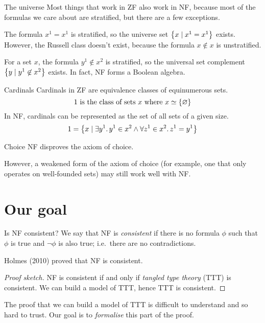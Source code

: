 \documentclass[xcolor=dvipsnames]{beamer}
\begin{document}
\begin{frame}{The universe}
    Most things that work in ZF also work in NF, because most of the formulas we care about are stratified, but there are a few exceptions.

    \medskip

    The formula \( x^1 = x^1 \) is stratified, so the universe set \( \qty{x\mid x^1 = x^1} \) exists. However, the Russell class doesn't exist, because the formula \( x \not\in x \) is unstratified.

    \medskip

    For a set \( x \), the formula \( y^1 \not\in x^2 \) is stratified, so the universal set complement \( \qty{y\mid y^1 \not\in x^2} \) exists. In fact, NF forms a Boolean algebra.
\end{frame}
\begin{frame}{Cardinals}
    Cardinals in ZF are equivalence classes of equinumerous sets.
    \[ 1 \text{ is the class of sets } x \text{ where } x \simeq \qty{\varnothing} \]
    In NF, cardinals can be represented as the set of all sets of a given size.
    \[ 1 = \qty{x\mid \exists y^1.\, y^1 \in x^2 \wedge \forall z^1 \in x^2.\, z^1 = y^1} \]
\end{frame}
\begin{frame}{Choice}
    NF disproves the axiom of choice.

    \medskip

    However, a weakened form of the axiom of choice (for example, one that only operates on well-founded sets) may still work well with NF.
\end{frame}

\section{Our goal}

\begin{frame}{Is NF consistent?}
    We say that NF is \emph{consistent} if there is no formula \( \phi \) such that \( \phi \) is true and \( \neg\phi \) is also true; i.e.\, there are no contradictions.

    Holmes (2010) proved that NF is consistent.

    \begin{proof}[Proof sketch]
        NF is consistent if and only if \emph{tangled type theory} (TTT) is consistent.
        We can build a model of TTT, hence TTT is consistent.
    \end{proof}

    The proof that we can build a model of TTT is difficult to understand and so hard to trust. Our goal is to \emph{formalise} this part of the proof.
\end{frame}


\end{document}
